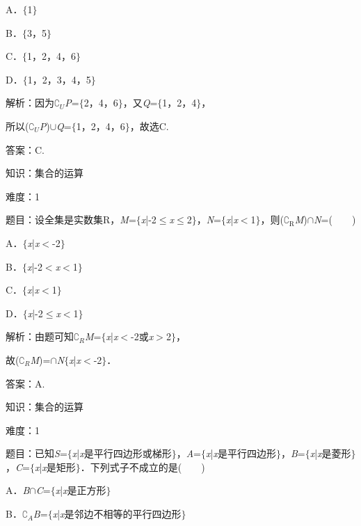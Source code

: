 \documentclass{article} %
\begin{document}
A．$\mathrm{\{}$1$\mathrm{\}}$   

B．$\mathrm{\{}$3，5$\mathrm{\}}$

C．$\mathrm{\{}$1，2，4，6$\mathrm{\}}$   

D．$\mathrm{\{}$1，2，3，4，5$\mathrm{\}}$

解析：因为$\mathrm{\complement}$\textit{${}_{U}$P}=$\mathrm{\{}$2，4，6$\mathrm{\}}$，又\textit{Q}=$\mathrm{\{}$1，2，4$\mathrm{\}}$，

所以($\mathrm{\complement}$\textit{${}_{U}$P})$\mathrm{\cup}$\textit{Q}=$\mathrm{\{}$1，2，4，6$\mathrm{\}}$，故选C.

答案：C.

知识：集合的运算

难度：1

题目：设全集是实数集R，\textit{M}=$\mathrm{\{}$\textit{x}|-2$\mathrm{\le}$\textit{x}$\mathrm{\le}$2$\mathrm{\}}$，\textit{N}=$\mathrm{\{}$\textit{x}|\textit{x}$\mathrm{<}$1$\mathrm{\}}$，则($\mathrm{\complement_{R}}$\textit{M})$\mathrm{\cap}$\textit{N}=(　　)

A．$\mathrm{\{}$\textit{x}|\textit{x}$\mathrm{<}$-2$\mathrm{\}}$   

B．$\mathrm{\{}$\textit{x}|-2$\mathrm{<}$\textit{x}$\mathrm{<}$1$\mathrm{\}}$

C．$\mathrm{\{}$\textit{x}|\textit{x}$\mathrm{<}$1$\mathrm{\}}$   

D．$\mathrm{\{}$\textit{x}|-2$\mathrm{\le}$\textit{x}$\mathrm{<}$1$\mathrm{\}}$

解析：由题可知$\mathrm{\complement}_{R}$\textit{M}=$\mathrm{\{}$\textit{x}|\textit{x}$\mathrm{<}$-2或\textit{x}$\mathrm{>}$2$\mathrm{\}}$，

故($\mathrm{\complement}_{R}$\textit{M})=$\mathrm{\cap}$\textit{N}$\mathrm{\{}$\textit{x}|\textit{x}$\mathrm{<}$-2$\mathrm{\}}$．

答案：A.

知识：集合的运算

难度：1

题目：已知\textit{S}=$\mathrm{\{}$\textit{x}|\textit{x}是平行四边形或梯形$\mathrm{\}}$，\textit{A}=$\mathrm{\{}$\textit{x}|\textit{x}是平行四边形$\mathrm{\}}$，\textit{B}=$\mathrm{\{}$\textit{x}|\textit{x}是菱形$\mathrm{\}}$，\textit{C}=$\mathrm{\{}$\textit{x}|\textit{x}是矩形$\mathrm{\}}$．下列式子不成立的是(　　)

A．\textit{B}$\mathrm{\cap}$\textit{C}=$\mathrm{\{}$\textit{x}|\textit{x}是正方形$\mathrm{\}}$

B．$\mathrm{\complement}$\textit{${}_{A}$B}=$\mathrm{\{}$\textit{x}|\textit{x}是邻边不相等的平行四边形$\mathrm{\}}$
\end{document}
